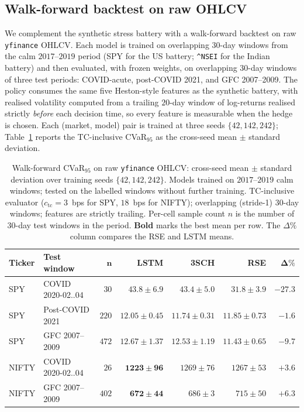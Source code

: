 \documentclass[10pt,letterpaper]{article}
\begin{document}
\subsection{Walk-forward backtest on raw OHLCV}\label{sec:walkforward}

We complement the synthetic stress battery with a walk-forward
backtest on raw \texttt{yfinance} OHLCV. Each model is trained on
overlapping $30$-day windows from the calm $2017$--$2019$ period
(SPY for the US battery; \texttt{\^{}NSEI} for the Indian battery)
and then evaluated, with frozen weights, on overlapping $30$-day
windows of three test periods: COVID-acute, post-COVID 2021, and
GFC 2007--2009. The policy consumes the same five Heston-style
features as the synthetic battery, with realised volatility
computed from a trailing $20$-day window of log-returns realised
strictly \emph{before} each decision time, so every feature is
measurable when the hedge is chosen. Each (market, model) pair is
trained at three seeds $\{42,142,242\}$;
Table~\ref{tab:walkforward} reports the TC-inclusive CVaR$_{95}$
as the cross-seed mean $\pm$ standard deviation.

\begin{table}[ht]
\centering\small
\caption{Walk-forward CVaR$_{95}$ on raw \texttt{yfinance} OHLCV:
cross-seed mean $\pm$ standard deviation over training seeds
$\{42,142,242\}$. Models trained on $2017$--$2019$ calm windows;
tested on the labelled windows without further training.
TC-inclusive evaluator ($c_{\mathrm{tc}}=3$~bps for SPY, $18$~bps
for NIFTY); overlapping (stride-1) $30$-day windows; features are
strictly trailing. Per-cell sample count $n$ is the number of
$30$-day test windows in the period. \textbf{Bold} marks the best
mean per row. The $\Delta\%$ column compares the RSE and LSTM
means.}
\label{tab:walkforward}
\begin{tabular}{@{}llrrrrr@{}}
\toprule
\textbf{Ticker} & \textbf{Test window} & $\boldsymbol{n}$ & \textbf{LSTM} & \textbf{3SCH} & \textbf{RSE} & $\boldsymbol{\Delta\%}$ \\\midrule
SPY    & COVID 2020-02..04   & $30$  & $43.8\pm 6.9$  & $43.4\pm 5.0$  & $\mathbf{31.8\pm 3.9}$  & $\mathbf{-27.3}$ \\
SPY    & Post-COVID 2021     & $220$ & $12.05\pm 0.45$ & $\mathbf{11.74\pm 0.31}$ & $11.85\pm 0.73$ & $-1.6$ \\
SPY    & GFC 2007--2009      & $472$ & $12.67\pm 1.37$ & $12.53\pm 1.19$ & $\mathbf{11.43\pm 0.65}$ & $\mathbf{-9.7}$ \\
NIFTY  & COVID 2020-02..04   & $26$  & $\mathbf{1223\pm 96}$ & $1269\pm 76$ & $1267\pm 53$ & $+3.6$ \\
NIFTY  & GFC 2007--2009      & $402$ & $\mathbf{672\pm 44}$  & $686\pm 3$   & $715\pm 50$  & $+6.3$ \\
\bottomrule
\end{tabular}
\end{table}
\end{document}
